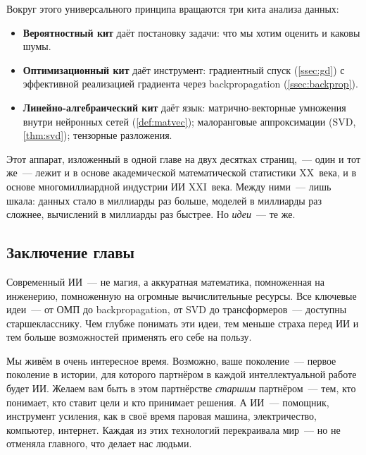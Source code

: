 Вокруг этого универсального принципа вращаются три кита анализа
данных:
\begin{itemize}\itemsep1pt
  \item \textbf{Вероятностный кит} даёт постановку задачи: что мы
        хотим оценить и каковы шумы.
  \item \textbf{Оптимизационный кит} даёт инструмент: градиентный
        спуск (\cref{ssec:gd}) с эффективной реализацией градиента
        через backpropagation (\cref{ssec:backprop}).
  \item \textbf{Линейно-алгебраический кит} даёт язык:
        матрично-векторные умножения внутри нейронных сетей
        (\cref{def:matvec}); малоранговые аппроксимации (SVD,
        \cref{thm:svd}); тензорные разложения.
\end{itemize}

Этот аппарат, изложенный в одной главе на двух десятках страниц,~---
один и тот же~--- лежит и в основе академической математической
статистики XX~века, и в основе многомиллиардной индустрии ИИ
XXI~века. Между ними~--- лишь шкала: данных стало в миллиарды раз
больше, моделей в миллиарды раз сложнее, вычислений в миллиарды раз
быстрее. Но \emph{идеи}~--- те же.

\subsection*{Заключение главы}

Современный ИИ~--- не магия, а аккуратная математика, помноженная на
инженерию, помноженную на огромные вычислительные ресурсы. Все
ключевые идеи~--- от ОМП до backpropagation, от SVD до трансформеров~---
доступны старшекласснику. Чем глубже понимать эти идеи, тем меньше
страха перед ИИ и тем больше возможностей применять его себе на
пользу.

Мы живём в очень интересное время. Возможно, ваше поколение~---
первое поколение в истории, для которого партнёром в каждой
интеллектуальной работе будет ИИ. Желаем вам быть в этом партнёрстве
\emph{старшим} партнёром~--- тем, кто понимает, кто ставит цели и
кто принимает решения. А ИИ~--- помощник, инструмент усиления, как в
своё время паровая машина, электричество, компьютер, интернет. Каждая
из этих технологий перекраивала мир~--- но не отменяла главного,
что делает нас людьми.

